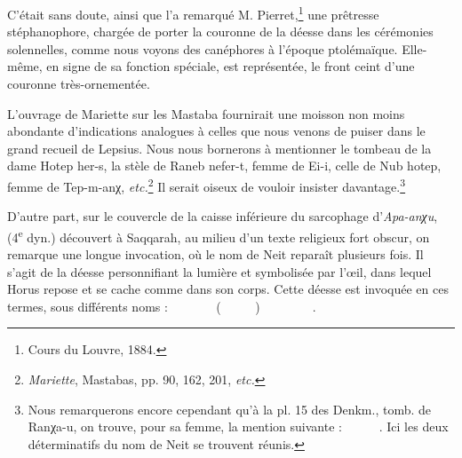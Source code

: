\documentclass[a4paper, 11pt, oneside]{article}
\newcommand*\hieroAAAH{}
\newcommand*\hieroAAAO{}
\newcommand*\hieroAAAQ{}
\newcommand*\hieroAAAX{}
\newcommand*\hieroAABF{}
\newcommand*\hieroAACB{\raisebox{0.5ex}{}}
\newcommand*\hieroAACL{\raisebox{0.5ex}{}}
\newcommand*\hieroAACM{}
\newcommand*\hieroAACP{}
\newcommand*\hieroAADF{}
\newcommand*\hieroAAEB{}
\newcommand*\hieroAAEK{}
\newcommand*\hieroAAEZ{}
\newcommand*\hieroAAHC{}
\newcommand*\hieroAAIK{}
\newcommand*\hieroAAIS{}
\newcommand*\hieroAAJN{}
\newcommand*\hieroAALA{}
\newcommand*\hieroAALU{\raisebox{0.5ex}{}}
\newcommand*\hieroAALX{\raisebox{0.5ex}{}}
\newcommand*\hieroAAOL{}
\newcommand*\hieroAAQC{}
\newcommand*\hieroAARM{}
\newcommand*\hieroAARN{}
\newcommand*\hieroAARO{}
\newcommand*\hieroAARR{}
\newcommand*\hieroAARS{}
\newcommand*\hieroAART{}
\newcommand*\hieroAARU{}
\newcommand*\hieroAARV{}
\newcommand*\hieroAARW{}
\newcommand*\hieroAARX{}
\newcommand*\hieroAARY{}
\newcommand*\hieroAARZ{}
\newcommand*\hieroAASA{}
\newcommand*\hieroAASB{}
\newcommand*\hieroAASC{}
\begin{document}
C'était sans doute, ainsi que l'a remarqué M. Pierret,\footnote{Cours du Louvre, 1884.} une prêtresse stéphanophore, chargée de porter la couronne de la déesse dans les cérémonies solennelles, comme nous voyons des canéphores à l'époque ptolémaïque. Elle-même, en signe de sa fonction spéciale, est représentée, le front ceint d'une couronne très-ornementée.

L'ouvrage de Mariette sur les Mastaba fournirait une moisson non moins abondante d'indications analogues à celles que nous venons de puiser dans le grand recueil de Lepsius. Nous nous bornerons à mentionner le tombeau de la dame Hotep her-s, la stèle de Raneb nefer-t, femme de Ei-i, celle de Nub hotep, femme de Tep-m-anχ, \emph{etc.}\footnote{\emph{Mariette}, Mastabas, pp. 90, 162, 201, \emph{etc.}} Il serait oiseux de vouloir insister davantage.\footnote{Nous remarquerons encore cependant qu'à la pl. 15 des Denkm., tomb. de Ranχa-u, on trouve, pour sa femme, la mention suivante : $\hieroAAAX\:\hieroAARO\:\hieroAARM\allowbreak\:\hieroAAEK\:\hieroAAHC\:\hieroAAAQ\allowbreak\:\hieroAABF\:\hieroAAAO\:\hieroAAEK\allowbreak\:\hieroAAHC\:\hieroAARR\allowbreak\:\hieroAARS\:\hieroAARR$. Ici les deux déterminatifs du nom de Neit se trouvent réunis.}

D'autre part, sur le couvercle de la caisse inférieure du sarcophage d'\emph{Apa-anχu}, (4\textsuperscript{e} dyn.) découvert à Saqqarah, au milieu d'un texte religieux fort obscur, on remarque une longue invocation, où le nom de Neit reparaît plusieurs fois. Il s'agit de la déesse personnifiant la lumière et symbolisée par l'œil, dans lequel Horus repose et se cache comme dans son corps. Cette déesse est invoquée en ces termes, sous différents noms : $\hieroAALU\:\hieroAAAH\:\hieroAADF\allowbreak\:\hieroAAAQ\:\hieroAAQC\:\hieroAALU\allowbreak\:\hieroAAAH\:\hieroAADF\:\hieroAAAH\allowbreak\:\hieroAART\:\hieroAACL\:\hieroAARN\allowbreak\:\hieroAALU\:\hieroAAAH\:\hieroAADF$ ($\hieroAAJN\:\hieroAACB\:\hieroAALA\allowbreak\:\hieroAALU\:\hieroAAAH\:\hieroAADF\allowbreak\:\hieroAARU\:\hieroAAEZ\:\hieroAARV\allowbreak\:\hieroAALA\:\hieroAALU\allowbreak\:\hieroAAAH\:\hieroAADF$) $\hieroAARW\:\hieroAACB\:\hieroAARN\allowbreak\:\hieroAAIK\:\hieroAALX\:\hieroAARX\allowbreak\:\hieroAARY\:\hieroAAAQ\:\hieroAAAH\allowbreak\:\hieroAACP\:\hieroAARZ\:\hieroAACM\allowbreak\:\hieroAAEB\:\hieroAAOL\:\hieroAAIS\allowbreak\:\hieroAASA\:\hieroAASB\:\hieroAASC\hieroAASC\hieroAASC\hieroAASC\hieroAASC\hieroAASC\hieroAASC\hieroAASC\hieroAASC\hieroAASC\hieroAASC$.
\end{document}
